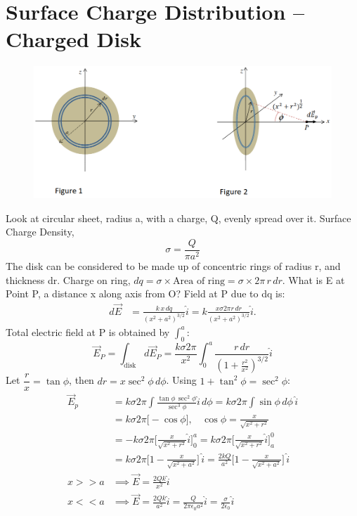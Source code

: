 \documentclass[a4paper, 11pt, normalem]{report}
\begin{document}
\section{Surface Charge Distribution -- Charged Disk}
\begin{figure}[H]
    \centering
    \includegraphics[scale=0.4]{R1.png}
\end{figure}
Look at circular sheet, radius a, with a charge, Q, evenly spread over it.
Surface Charge Density,
\begin{equation}
    \sigma = \dfrac{Q}{\pi a^{2}}
\end{equation}
The disk can be considered to be made up of concentric rings of radius r, and thickness dr.
Charge on ring, $dq = \sigma \times \text{Area of ring} = \sigma \times 2\pi \, r \, dr$.
What is E at Point P, a distance x along axis from O?
Field at P due to dq is:
\begin{align}
    d\vec{E} &= \frac{k \, x \, dq}{(x^{2} + a^{2})^{3/2}} \hat{i} = k \frac{x \sigma 2\pi r \, dr}{(x^{2} + a^{2})^{3/2}} \hat{i}.
\end{align}
Total electric field at P is obtained by $\int_{0}^{a}$:
\begin{equation}
    \vec{E}_{P} = \int_{\text{disk}} d\vec{E}_{P} = \frac{k \sigma 2\pi}{x^{2}} \int_{0}^{a} \frac{r \, dr}{(1 + \tfrac{r^{2}}{x^{2}})^{3/2}} \hat{i}
\end{equation}
Let $\dfrac{r}{x} = \tan\phi$, then $dr = x\sec^{2}\phi \, d\phi$.
Using $1 + \tan^{2}\phi = \sec^{2}\phi$:
\begin{align}
    \vec{E}_p &= k \sigma 2\pi \int \frac{\tan\phi \, \sec^{2}\phi}{\sec^{3}\phi} \hat{i} \, d\phi = k \sigma 2\pi \int \sin\phi \, d\phi \, \hat{i} \\
              &= k \sigma 2\pi \big[-\cos\phi \big], ~~~~ \cos\phi = \frac{x}{\sqrt{x^{2} + r^{2}}} \\
              &= -k \sigma 2\pi \Big[\frac{x}{\sqrt{x^{2} + r^{2}}} \hat{i} \Big]_{0}^{a} = k \sigma 2\pi \Big[\frac{x}{\sqrt{x^{2} + r^{2}}} \hat{i} \Big]_{a}^{0} \\
              &= k \sigma 2\pi \Big[1 - \frac{x}{\sqrt{x^{2} + a^{2}}} \Big] \, \hat{i} = \frac{2 k Q}{a^{2}} \Big[1 - \frac{x}{\sqrt{x^{2} + a^{2}}} \Big] \, \hat{i}\\
    x >> a &\implies \vec{E} = \frac{2Qk}{x^{2}} \hat{i} \\
    x << a &\implies \vec{E} = \frac{2Qk}{a^{2}} \hat{i} = \frac{Q}{2\pi \epsilon_{0} a^{2}} \hat{i} = \frac{\sigma}{2\epsilon_{0}} \hat{i}
\end{align}
\end{document}
